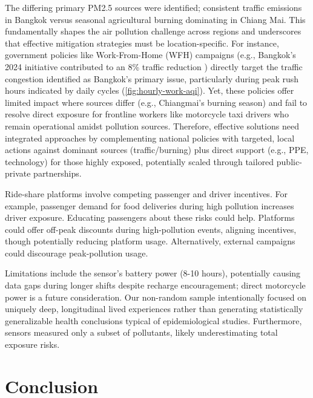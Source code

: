 \documentclass[sigconf,screen,natbib=true]{acmart}
\begin{document}
The differing primary PM2.5 sources were identified; consistent traffic emissions in Bangkok versus seasonal agricultural burning dominating in Chiang Mai. 
This fundamentally shapes the air pollution challenge across regions and underscores that effective mitigation strategies must be location-specific. 
For instance, government policies like Work-From-Home (WFH) campaigns (e.g., Bangkok's 2024 initiative contributed to an 8\% traffic reduction  \cite{Wipatayotin_2025}) directly target the traffic congestion identified as Bangkok's primary issue, particularly during peak rush hours indicated by daily cycles (\autoref{fig:hourly-work-aqi}). 
Yet, these policies offer limited impact where sources differ (e.g., Chiangmai's burning season) and fail to resolve direct exposure for frontline workers like motorcycle taxi drivers who remain operational amidst pollution sources.
Therefore, effective solutions need integrated approaches by complementing national policies with targeted, local actions against dominant sources (traffic/burning) plus direct support (e.g., PPE, technology) for those highly exposed, potentially scaled through tailored public-private partnerships.











Ride-share platforms involve competing passenger and driver incentives.
For example, passenger demand for food deliveries during high pollution increases driver exposure.
Educating passengers about these risks could help.
Platforms could offer off-peak discounts during high-pollution events, aligning incentives, though potentially reducing platform usage.
Alternatively, external campaigns could discourage peak-pollution usage.















Limitations include the sensor's battery power (8-10 hours), potentially causing data gaps during longer shifts despite recharge encouragement; direct motorcycle power is a future consideration.
Our non-random sample intentionally focused on uniquely deep, longitudinal lived experiences rather than generating statistically generalizable health conclusions typical of epidemiological studies.
Furthermore, sensors measured only a subset of pollutants, likely underestimating total exposure risks. \section{Conclusion}
\end{document}
